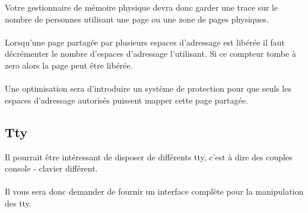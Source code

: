 \documentclass[10pt,a4wide]{article}
\begin{document}
Votre gestionnaire de m\'emoire physique devra donc garder une trace sur
le nombre de personnes utilisant une page ou une zone de pages physiques.

\paragraph{}

Lorsqu'une page partag\'ee par plusieurs espaces d'adressage est lib\'er\'ee
il faut d\'ecr\'ementer le nombre d'espaces d'adressage l'utilisant. Si ce
compteur tombe \`a zero alors la page peut \^etre lib\'er\'ee.

\paragraph{}

Une optimisation sera d'introduire un syst\`eme de protection pour que
seuls les espaces d'adressage autoris\'es puissent mapper cette page
partag\'ee.

\subsection{Tty}

Il pourrait \^etre int\'eressant de disposer de diff\'erents tty, c'est \`a
dire des couples console - clavier diff\'erent.

\paragraph{}

Il vous sera donc demander de fournir un interface compl\`ete pour la
manipulation des tty.
\end{document}
